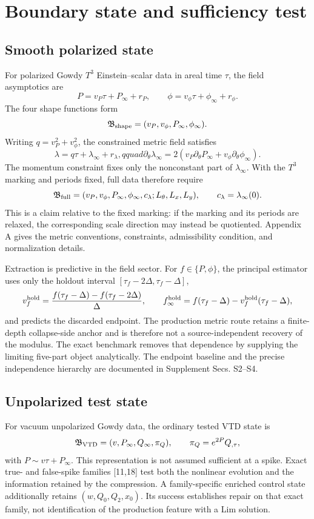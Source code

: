 \documentclass{iopjournal}
\begin{document}
\section{Boundary state and sufficiency test}
\subsection{Smooth polarized state}
For polarized Gowdy $T^3$ Einstein--scalar data in areal time $\tau$, the field asymptotics are
\[
P=v_P\tau+P_\infty+r_P,\qquad
\phi=v_\phi\tau+\phi_\infty+r_\phi .
\]
The four shape functions form
\[
\mathfrak B_{\rm shape}=(v_P,v_\phi,P_\infty,\phi_\infty).
\]
Writing $q=v_P^2+v_\phi^2$, the constrained metric field satisfies
\[
\lambda=q\tau+\lambda_\infty+r_\lambda,qquad
\partial_\theta\lambda_\infty=2(v_P\partial_\theta P_\infty+v_\phi\partial_\theta\phi_\infty).
\]
The momentum constraint fixes only the nonconstant part of $\lambda_\infty$. With the $T^3$ marking and periods fixed, full data therefore require
\[
\mathfrak B_{\rm full}=(v_P,v_\phi,P_\infty,\phi_\infty,c_\lambda;L_\theta,L_x,L_y),
\qquad c_\lambda=\lambda_\infty(0).
\]
This is a claim relative to the fixed marking: if the marking and its periods are relaxed, the corresponding scale direction may instead be quotiented. Appendix A gives the metric conventions, constraints, admissibility condition, and normalization details.

Extraction is predictive in the field sector. For $f\in\{P,\phi\}$, the principal estimator uses only the holdout interval $[\tau_f-2\Delta,\tau_f-\Delta]$,
\[
v_f^{\rm hold}=\frac{f(\tau_f-\Delta)-f(\tau_f-2\Delta)}{\Delta},\qquad
f_\infty^{\rm hold}=f(\tau_f-\Delta)-v_f^{\rm hold}(\tau_f-\Delta),
\]
and predicts the discarded endpoint. The production metric route retains a finite-depth collapse-side anchor and is therefore not a source-independent recovery of the modulus. The exact benchmark removes that dependence by supplying the limiting five-part object analytically. The endpoint baseline and the precise independence hierarchy are documented in Supplement Secs. S2--S4.

\subsection{Unpolarized test state}
For vacuum unpolarized Gowdy data, the ordinary tested VTD state is
\[
\mathfrak B_{\rm VTD}=(v,P_\infty,Q_\infty,\pi_Q),
\qquad \pi_Q=e^{2P}Q_{,\tau},
\]
with $P\sim v\tau+P_\infty$. This representation is not assumed sufficient at a spike. Exact true- and false-spike families [11,18] test both the nonlinear evolution and the information retained by the compression. A family-specific enriched control state additionally retains $(w,Q_0,Q_2,x_0)$. Its success establishes repair on that exact family, not identification of the production feature with a Lim solution.
\end{document}
